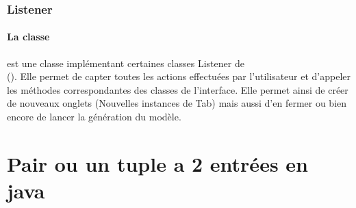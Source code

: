 \subsubsection{Listener}

\paragraph{La classe } est une classe implémentant certaines classes Listener de \\\Swing (). Elle permet de capter toutes les actions effectuées par l'utilisateur et d'appeler les méthodes correspondantes des classes de l'interface. Elle permet ainsi de créer de nouveaux onglets (Nouvelles instances de Tab) mais aussi d'en fermer ou bien encore de lancer la génération du modèle.

\section{Pair ou un tuple a 2 entrées en java}
